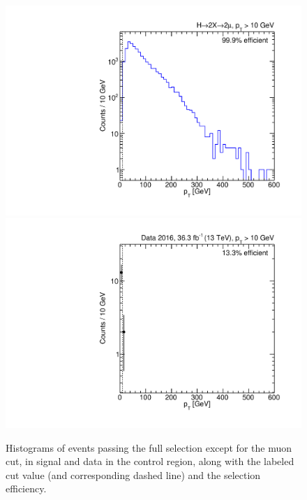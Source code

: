 \begin{figure}[p]
  \centering
  \includegraphics[width=\DSquareWidth]{figures/displaced/NM1_2Mu2J_pT.pdf}
  \hspace*{-2em}
  \includegraphics[width=\DSquareWidth]{figures/displaced/NM1_Data_pT.pdf}
  \caption[Histograms of events passing the full selection except for the muon \pT cut in \twoMu signal and data.]{Histograms of events passing the full selection except for the muon \pT cut, in  \twoMu signal and  data in the control region, along with the labeled cut value (and corresponding dashed line) and the selection efficiency.}
  \label{fig:dd:NM1_pT}
\end{figure}

